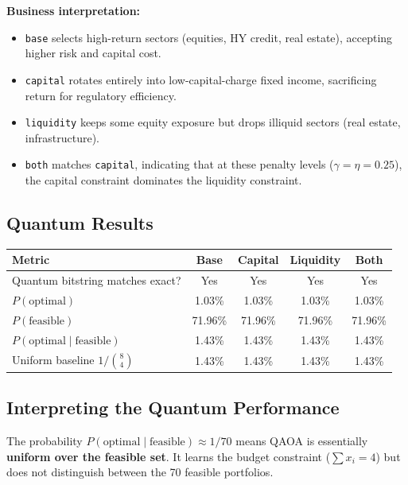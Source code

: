 \documentclass[12pt, a4paper]{article}
\begin{document}
\textbf{Business interpretation:}
\begin{itemize}
    \item \texttt{base} selects high-return sectors (equities, HY credit, real estate), accepting higher risk and capital cost.
    \item \texttt{capital} rotates entirely into low-capital-charge fixed income, sacrificing return for regulatory efficiency.
    \item \texttt{liquidity} keeps some equity exposure but drops illiquid sectors (real estate, infrastructure).
    \item \texttt{both} matches \texttt{capital}, indicating that at these penalty levels ($\gamma = \eta = 0.25$), the capital constraint dominates the liquidity constraint.
\end{itemize}

\subsection{Quantum Results}

\begin{center}
\begin{tabular}{lcccc}
\toprule
\textbf{Metric} & \textbf{Base} & \textbf{Capital} & \textbf{Liquidity} & \textbf{Both} \\
\midrule
Quantum bitstring matches exact? & Yes & Yes & Yes & Yes \\
$P(\text{optimal})$ & 1.03\% & 1.03\% & 1.03\% & 1.03\% \\
$P(\text{feasible})$ & 71.96\% & 71.96\% & 71.96\% & 71.96\% \\
$P(\text{optimal} \mid \text{feasible})$ & 1.43\% & 1.43\% & 1.43\% & 1.43\% \\
Uniform baseline $1/\binom{8}{4}$ & 1.43\% & 1.43\% & 1.43\% & 1.43\% \\
\bottomrule
\end{tabular}
\end{center}

\subsection{Interpreting the Quantum Performance}

The probability $P(\text{optimal} \mid \text{feasible}) \approx 1/70$ means
QAOA is essentially \textbf{uniform over the feasible set}. It learns the budget
constraint ($\sum x_i = 4$) but does not distinguish between the 70 feasible
portfolios.
\end{document}

